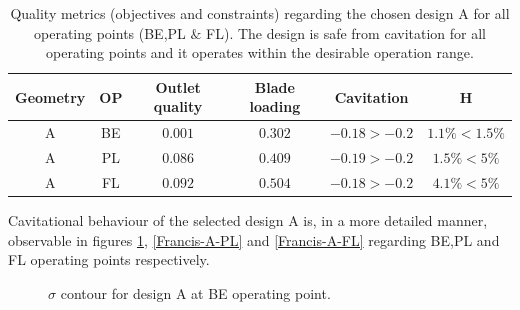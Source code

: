 \begin{table}[h!]
\begin{center}
\begin{tabular}{ |c|c|c|c|c|c| }
\hline
Geometry & OP & Outlet quality & Blade loading  & Cavitation & H\\
\hline
A & BE & $0.001$ & $0.302$ & $-0.18 > -0.2$ & $ 1.1\% <1.5\%$ \\
A & PL & $0.086$ & $0.409$ & $-0.19 > -0.2$ & $ 1.5\% <5\%$ \\
A & FL & $0.092$ & $0.504$ & $-0.18 > -0.2$ & $ 4.1\% <5\%$  \\
\hline
\end{tabular}
\caption{Quality metrics (objectives and constraints) regarding the chosen design A for all operating points (BE,PL $\&$ FL). The design is safe from cavitation for all operating points and it operates within the desirable operation range.}
\label{Asum}
\end{center}
\end{table} 

Cavitational behaviour of the selected design A is, in a more detailed manner, observable in figures \ref{Francis-A-BE}, \ref{Francis-A-PL} and \ref{Francis-A-FL} regarding BE,PL and FL operating points respectively.      


\begin{figure}[h!]
\begin{minipage}[b]{1\linewidth}
 \centering
\end{minipage}
\caption{$\sigma$ contour for design A at BE operating point.}
\label{Francis-A-BE}
\end{figure}


